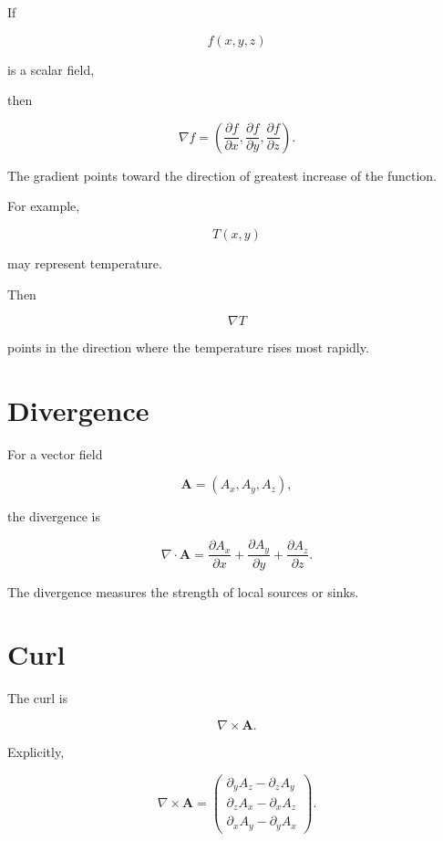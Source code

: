 \documentclass[11pt,a4paper,openany]{book}
\newcounter{example}[chapter]
\begin{document}
If

\[
f(x,y,z)
\]

is a scalar field,

then

\[
\boxed{
	\nabla f
	=
	\left(
	\frac{\partial f}{\partial x},
	\frac{\partial f}{\partial y},
	\frac{\partial f}{\partial z}
	\right).
}
\]

The gradient points toward the direction of greatest increase of the function.

For example,

\[
T(x,y)
\]

may represent temperature.

Then

\[
\nabla T
\]

points in the direction where the temperature rises most rapidly.


\section{Divergence}

For a vector field

\[
\mathbf A
=
(A_x,A_y,A_z),
\]

the divergence is

\[
\boxed{
	\nabla\cdot\mathbf A
	=
	\frac{\partial A_x}{\partial x}
	+
	\frac{\partial A_y}{\partial y}
	+
	\frac{\partial A_z}{\partial z}.
}
\]

The divergence measures the strength of local sources or sinks.


\section{Curl}

The curl is

\[
\boxed{
	\nabla\times\mathbf A.
}
\]

Explicitly,

\[
\nabla\times\mathbf A
=
\begin{pmatrix}
	\partial_yA_z-\partial_zA_y\\
	\partial_zA_x-\partial_xA_z\\
	\partial_xA_y-\partial_yA_x
\end{pmatrix}.
\]
\end{document}
